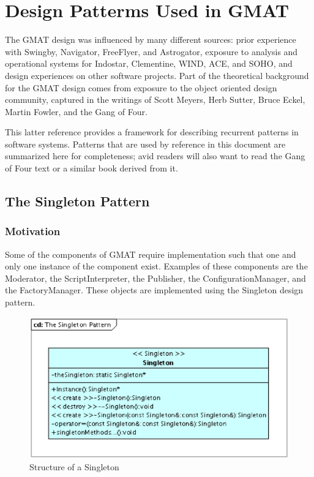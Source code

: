 \chapter{\label{chapter:Patterns}Design Patterms Used in GMAT}

The GMAT design was influenced by many different sources: prior experience with Swingby, Navigator,
FreeFlyer, and Astrogator, exposure to analysis and operational systems for Indostar, Clementine,
WIND, ACE, and SOHO, and design experiences on other software projects.  Part of the theoretical
background for the GMAT design comes from exposure to the object oriented design community,
captured in the writings of Scott Meyers, Herb Sutter, Bruce Eckel, Martin Fowler, and the Gang of
Four\cite{GoF}.

This latter reference provides a framework for describing recurrent patterns in software systems.
Patterns that are used by reference in this document are summarized here for completeness; avid
readers will also want to read the Gang of Four text or a similar book derived from it.

\section{\label{section:TheSingletonPattern}The Singleton Pattern}

\subsection{Motivation}
Some of the components of GMAT require implementation such that one and only one instance of the
component exist.  Examples of these components are the Moderator, the ScriptInterpreter, the
Publisher, the ConfigurationManager, and the FactoryManager.  These objects are implemented using
the Singleton design pattern.

\begin{figure}[htb]
\begin{center}
\includegraphics[scale=0.5]{Images/TheSingletonPattern.eps}
\caption{\label{figure:TheSingletonPattern}Structure of a Singleton}
\end{center}
\end{figure}

